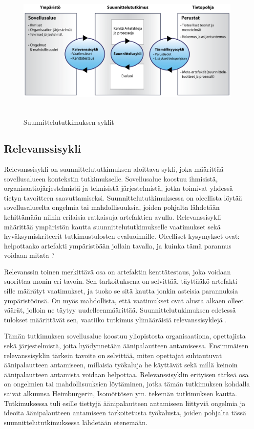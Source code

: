 \documentclass[utf8]{gradu3}
\begin{document}
\begin{figure}[h]\centering
  \includegraphics[height=7cm,keepaspectratio]{DSR}
  \caption[]{Suunnittelututkimuksen syklit}
  \label{fig:dsr}
\end{figure}

\subsection{Relevanssisykli}

Relevanssisykli on suunnittelututkimuksen aloittava sykli, joka määrittää sovellusalueen kontekstin tutkimukselle. Sovellusalue koostuu ihmisistä, organisaatiojärjestelmistä ja teknisistä järjestelmistä, jotka toimivat yhdessä tietyn tavoitteen saavuttamiseksi. Suunnittelututkimuksessa on oleellista löytää sovellusalueelta ongelmia tai mahdollisuuksia, joiden pohjalta lähdetään kehittämään niihin erilaisia ratkaisuja artefaktien avulla. Relevanssisykli määrittää ympäristön kautta suunnittelututkimukselle vaatimukset sekä hyväksymiskriteerit tutkimustulosten evaluoinnille. Oleelliset kysymykset ovat: helpottaako artefakti ympäristöään jollain tavalla, ja kuinka tämä parannus voidaan mitata \parencite[][]{cycles}?

Relevanssin toinen merkittävä osa on artefaktin kenttätestaus, joka voidaan suorittaa monin eri tavoin. Sen tarkoituksena on selvittää, täyttääkö artefakti sille määrätyt vaatimukset, ja tuoko se sitä kautta jonkin asteisia parannuksia ympäristöönsä. On myös mahdollista, että vaatimukset ovat alusta alkaen olleet väärät, jolloin ne täytyy uudelleenmäärittää. Suunnittelutukimuksen edetessä tulokset määrittävät sen, vaatiiko tutkimus ylimääräisiä relevanssisyklejä \parencite[][]{cycles}.

Tämän tutkimuksen sovellusalue koostuu yliopistosta organisaationa, opettajista sekä järjestelmistä, joita hyödynnetään äänipalautteen antamisessa. Ensimmäisen relevanssisyklin tärkein tavoite on selvittää, miten opettajat suhtautuvat äänipalautteen antamiseen, millaisia työkaluja he käyttävät sekä millä keinoin äänipalautteen antamista voidaan helpottaa. Relevanssisyklin erityisen tärkeä osa on ongelmien tai mahdollisuuksien löytäminen, jotka tämän tutkimuksen kohdalla saivat alkuunsa Heimburgerin, Isomöttösen ym. \parencite[][]{academics} tekemän tutkimuksen kautta. Tutkimuksessa tuli esille tiettyjä äänipalautteen antamiseen liittyviä ongelmia ja ideoita äänipalautteen antamiseen tarkoitetusta työkalusta, joiden pohjalta tässä suunnittelututkimuksessa lähdetään etenemään.
\end{document}

